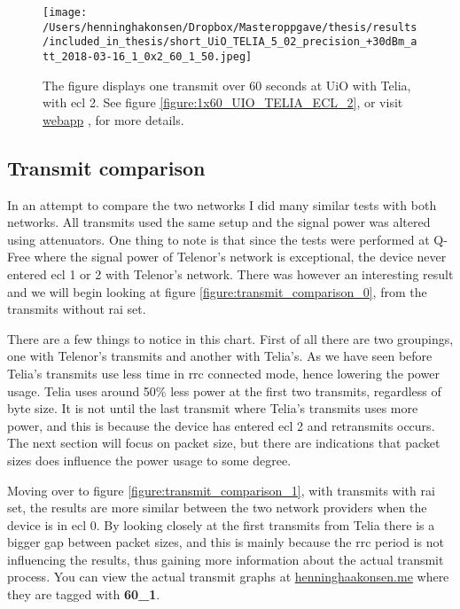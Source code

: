\documentclass[USenglish]{ifimaster}  %
\begin{document}
\begin{figure}[H]
  \centering
  \texttt{[image: /Users/henninghakonsen/Dropbox/Masteroppgave/thesis/results/included\_in\_thesis/short\_UiO\_TELIA\_5\_02\_precision\_+30dBm\_att\_2018-03-16\_1\_0x2\_60\_1\_50.jpeg]}
  \caption[Short-term test - \acrshort{ecl} 2]{The figure displays one transmit over 60 seconds at UiO with Telia, with \acrshort{ecl} 2. See figure \vref{figure:1x60_UIO_TELIA_ECL_2}, or visit \href{http://158.39.77.97:9000/\#/results/UiO\_TELIA\_5.02\_precision\_+30dBm\_att\_2018-03-16\_1\_0x2\_60\_1\_50}{webapp} \cite{online:result6}, for more details.}
  \label{figure:1x60_UIO_TELIA_ECL_2_SHORT}
\end{figure}

\subsection{Transmit comparison}
In an attempt to compare the two networks I did many similar tests with both networks. All transmits used the same setup and the signal power was altered using attenuators. One thing to note is that since the tests were performed at Q-Free where the signal power of Telenor's network is exceptional, the device never entered \acrshort{ecl} 1 or 2 with Telenor's network. There was however an interesting result and we will begin looking at figure \vref{figure:transmit_comparison_0}, from the transmits without \acrshort{rai} set.

There are a few things to notice in this chart. First of all there are two groupings, one with Telenor's transmits and another with Telia's. As we have seen before Telia's transmits use less time in \acrshort{rrc} connected mode, hence lowering the power usage. Telia uses around 50\% less power at the first two transmits, regardless of byte size. It is not until the last transmit where Telia's transmits uses more power, and this is because the device has entered \acrshort{ecl} 2 and retransmits occurs.
The next section will focus on packet size, but there are indications that packet sizes does influence the power usage to some degree.

Moving over to figure \vref{figure:transmit_comparison_1}, with transmits with \acrshort{rai} set, the results are more similar between the two network providers when the device is in \acrshort{ecl} 0. By looking closely at the first transmits from Telia there is a bigger gap between packet sizes, and this is mainly because the \acrshort{rrc} period is not influencing the results, thus gaining more information about the actual transmit process. You can view the actual transmit graphs at \url{henninghaakonsen.me} where they are tagged with \textbf{60\_1}.
\end{document}
